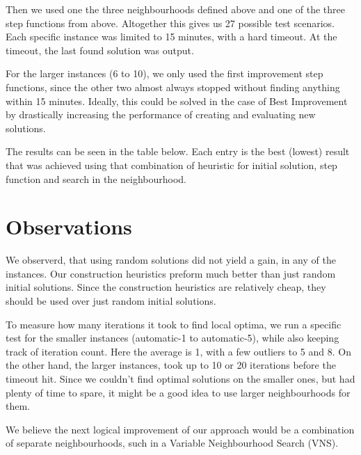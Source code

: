 \documentclass [11pt]{article}
\begin{document}
Then we used one the three neighbourhoods defined above and one of the three step functions from above. Altogether this gives us 27 possible test scenarios.  Each specific instance was limited to 15 minutes, with a hard timeout. At the timeout, the last found solution was output. 

For the larger instances (6 to 10), we only used the first improvement step functions, since the other two almost always stopped without finding anything within 15 minutes. Ideally, this could be solved in the case of Best Improvement by drastically increasing the performance of creating and evaluating new solutions. 

The results can be seen in the table below. Each entry is the best (lowest) result that was achieved using that combination of heuristic for initial solution, step function and search in the neighbourhood. 

\section{Observations}
We observerd, that using random solutions did not yield a gain, in any of the instances. Our construction heuristics preform much better than just random initial solutions. Since the construction heuristics are relatively cheap, they should be used over just random initial solutions.

To measure how many iterations it took to find local optima, we run a specific test for the smaller instances (automatic-1 to automatic-5), while also keeping track of iteration count. Here the average is 1, with a few outliers to 5 and 8. On the other hand, the larger instances, took up to 10 or 20 iterations before the timeout hit. Since we couldn't find optimal solutions on the smaller ones, but had plenty of time to spare, it might be a good idea to use larger neighbourhoods for them. 

We believe the next logical improvement of our approach would be a combination of separate neighbourhoods, such in a Variable Neighbourhood Search (VNS). 
\end{document}
